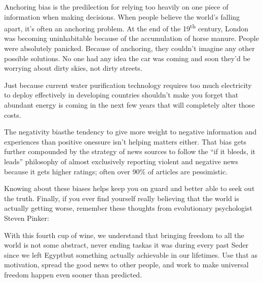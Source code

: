 {  \newReading Anchoring bias is the predilection for relying too heavily on one
  piece of information when making decisions. When people believe the world's
  falling apart, it's often an anchoring problem. At the end of the
  19\textsuperscript{th} century, London was becoming uninhabitable because of
  the accumulation of horse manure. People were absolutely panicked. Because of
  anchoring, they couldn't imagine any other possible solutions. No one had any
  idea the car was coming and soon they'd be worrying about dirty skies, not
  dirty streets.

  Just because current water purification technology requires too much
  electricity to deploy effectively in developing countries shouldn't make you
  forget that abundant energy is coming in the next few years that will
  completely alter those costs.

  The negativity bias\textemdash{}the tendency to give more weight to negative
  information and experiences than positive ones\textemdash{}sure isn't helping
  matters either. That bias gets further compounded by the strategy of news
  sources to follow the ``if it bleeds, it leads'' philosophy of almost
  exclusively reporting violent and negative news because it gets higher
  ratings; often over 90\% of articles are pessimistic.

  \newReading Knowing about these biases helps keep you on guard and better able
  to seek out the truth. Finally, if you ever find yourself really believing
  that the world is actually getting worse, remember these thoughts from
  evolutionary psychologist Steven Pinker:\par
  \noindent{}

  With this fourth cup of wine, we understand that bringing freedom to all the
  world is not some abstract, never ending task\textemdash{}as it was during
  every past Seder since we left Egypt\textemdash{}but something actually
  achievable in our lifetimes. Use that as motivation, spread the good news to
  other people, and work to make universal freedom happen even sooner than
  predicted.


}
